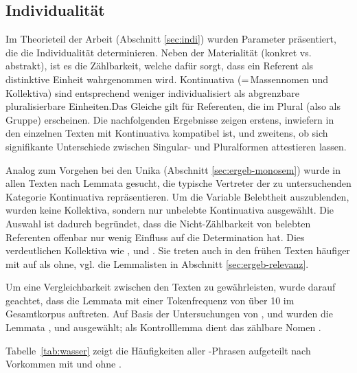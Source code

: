 \subsection{Individualität}\label{sec:ergeb-individualität}

Im Theorieteil der Arbeit (Abschnitt \ref{sec:indi}) wurden Parameter präsentiert, die die  Individualität determinieren. Neben der Materialität (konkret vs. abstrakt), ist es die Zählbarkeit, welche dafür sorgt, dass ein Referent als distinktive Einheit wahrgenommen wird. Kontinuativa (=\,Massennomen und Kollektiva) sind entsprechend weniger individualisiert als abgrenzbare pluralisierbare Einheiten.\linebreak Das Gleiche gilt für Referenten, die im Plural (also als Gruppe) erscheinen. Die nachfolgenden Ergebnisse zeigen erstens, inwiefern  in den einzelnen Texten mit Kontinuativa kompatibel ist, und zweitens, ob sich signifikante Unterschiede zwischen Singular- und Pluralformen attestieren lassen.


Analog zum Vorgehen bei den Unika (Abschnitt \ref{sec:ergeb-monosem}) wurde in allen Texten nach Lemmata gesucht, die typische Vertreter der zu untersuchenden Kategorie Kontinuativa repräsentieren. Um die Variable Belebtheit auszublenden, wurden keine Kollektiva, sondern nur unbelebte Kontinuativa ausgewählt. Die Auswahl ist dadurch begründet, dass die Nicht-Zählbarkeit von belebten Referenten offenbar nur wenig Einfluss auf die Determination hat. Dies verdeutlichen Kollektiva wie ,  und  . Sie treten auch in den frühen Texten häufiger mit  auf als ohne, vgl. die Lemmalisten in Abschnitt \ref{sec:ergeb-relevanz}. 

Um eine Vergleichbarkeit zwischen den Texten zu gewährleisten, wurde darauf geachtet, dass die Lemmata mit einer Tokenfrequenz von über 10 im Gesamtkorpus auftreten. Auf Basis der Untersuchungen von \textcite[28--29]{Graf1905}, \textcite[27--28]{Bell1907} und  \textcite[464ff]{Oubouzar1989} wurden die Lemmata  ,   und    ausgewählt; als Kontrolllemma dient das zählbare Nomen  . 

Tabelle~\ref{tab:wasser} zeigt die Häufigkeiten aller -Phrasen aufgeteilt nach Vorkommen mit und ohne . 

